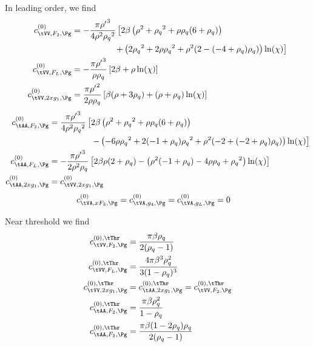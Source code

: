 In leading order, we find
\begin{align}
c^{(0)}_{\tVV,F_2,\Pg} &= -\frac{\pi {\rho'}^3 }{4 \rho ^2 {\rho_q}^2}\left[2\beta\left(\rho ^2+{\rho_q}^2+\rho  {\rho_q} (6+{\rho_q})\right) \right.\nonumber\\
 &\hspace{50pt}\left.+\left(2 {\rho_q}^2+2 \rho  {\rho_q}^2+\rho ^2 (2-(-4+{\rho_q}) {\rho_q})\right) \ln(\chi)\right]\\
c^{(0)}_{\tVV,F_L,\Pg} &= -\frac{\pi{\rho'}^3}{\rho\rho_q}\left[2\beta + \rho\ln(\chi)\right]\\
c^{(0)}_{\tVV,2xg_1,\Pg} &= \frac{\pi{\rho'}^2}{2\rho\rho_q}\left[\beta(\rho+3\rho_q) + (\rho+\rho_q)\ln(\chi)\right]
\end{align}
\begin{align}
c^{(0)}_{\tAA,F_2,\Pg} &= \frac{\pi {\rho'}^3}{4\rho^2{\rho_q}^2}\left[ 2\beta\left(\rho ^2+{\rho_q}^2+\rho  {\rho_q} (6+{\rho_q})\right) \right.\nonumber\\
 &\hspace{50pt} \left. - \left(-6 \rho  {\rho_q}^2+2 (-1+{\rho_q}) {\rho_q}^2+\rho ^2 (-2+(-2+{\rho_q}) {\rho_q})\right) \ln(\chi) \right] \\
c^{(0)}_{\tAA,F_L,\Pg} &=-\frac{\pi{\rho'}^3}{2\rho^2\rho_q}\left[2\beta\rho(2+\rho_q) - \left(\rho ^2 (-1+{\rho_q})-4 \rho  {\rho_q}+{\rho_q}^2\right) \ln(\chi)\right]\\
c^{(0)}_{\tAA,2xg_1,\Pg} &= c^{(0)}_{\tVV,2xg_1,\Pg}
\end{align}
\begin{align}
c^{(0)}_{\tVA,xF_3,\Pg} &= c^{(0)}_{\tVA,g_4,\Pg} = c^{(0)}_{\tVA,g_L,\Pg} = 0
\end{align}

Near threshold we find
\begin{align}
c^{(0),\tThr}_{\tVV,F_2,\Pg} &= \frac{\pi\beta\rho_q}{2(\rho_q-1)}\\
c^{(0),\tThr}_{\tVV,F_L,\Pg} &= \frac{4\pi\beta^3\rho_q^2}{3(1-\rho_q)^3}\\
c^{(0),\tThr}_{\tVV,2xg_1,\Pg} &= c^{(0),\tThr}_{\tAA,2xg_1,\Pg} = c^{(0),\tThr}_{\tVV,F_2,\Pg}\\
c^{(0),\tThr}_{\tAA,F_2,\Pg} &= \frac{\pi\beta\rho_q^2}{1-\rho_q}\\
c^{(0),\tThr}_{\tAA,F_2,\Pg} &= \frac{\pi\beta(1-2\rho_q)\rho_q}{2(\rho_q-1)}
\end{align}

